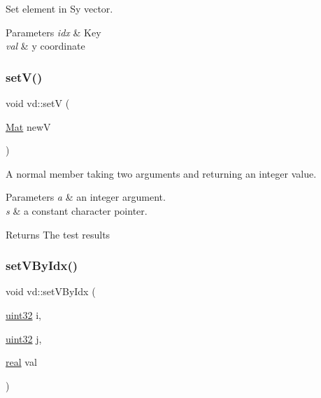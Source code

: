 Set element in Sy vector. 


\begin{DoxyParams}{Parameters}
{\em idx} & Key \\
\hline
{\em val} & y coordinate \\
\hline
\end{DoxyParams}
\mbox{\label{classvd_a33e792915ebd0295a3475fe686b41ee9}} 
\subsubsection{\texorpdfstring{set\+V()}{setV()}}
{\footnotesize\ttfamily void vd\+::setV (\begin{DoxyParamCaption}\item[{\mbox{\hyperlink{typedefs_8h_a9fa28c1f74e909474857584f5c7b0088}{Mat}}}]{newV }\end{DoxyParamCaption})}



A normal member taking two arguments and returning an integer value. 


\begin{DoxyParams}{Parameters}
{\em a} & an integer argument. \\
\hline
{\em s} & a constant character pointer. \\
\hline
\end{DoxyParams}
\begin{DoxyReturn}{Returns}
The test results 
\end{DoxyReturn}
\mbox{\label{classvd_a29670919bb8d5b2f2f0235ddfda6484e}} 
\subsubsection{\texorpdfstring{set\+V\+By\+Idx()}{setVByIdx()}}
{\footnotesize\ttfamily void vd\+::set\+V\+By\+Idx (\begin{DoxyParamCaption}\item[{\mbox{\hyperlink{typedefs_8h_a8ad23e2333787a214e20a58a284a5a60}{uint32}}}]{i,  }\item[{\mbox{\hyperlink{typedefs_8h_a8ad23e2333787a214e20a58a284a5a60}{uint32}}}]{j,  }\item[{\mbox{\hyperlink{typedefs_8h_a58a0c7cf2501f4492da833421be92547}{real}}}]{val }\end{DoxyParamCaption})}



